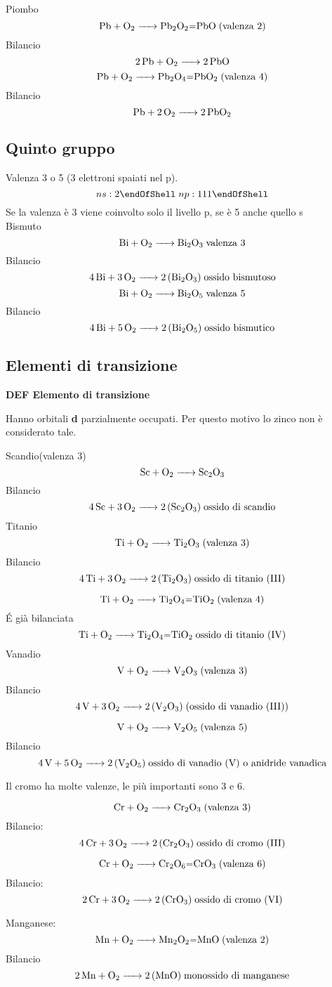 Piombo
$$\ce{Pb + O_2 -> Pb_2O_2=PbO} \; \text{(valenza 2)}$$
Bilancio
$$\ce{2Pb + O_2 -> 2PbO}$$
$$\ce{Pb + O_2 -> Pb_2O_4=PbO_2} \; \text{(valenza 4)}$$
Bilancio
$$\ce{Pb + 2O_2 -> 2PbO_2}$$
\subsection{Quinto gruppo}
Valenza 3 o 5 (3 elettroni spaiati nel p).
$$\subshell{ns:2} \; \subshell{np:111}$$
Se la valenza è 3 viene coinvolto solo il livello p, se è 5 anche quello s\\
Bismuto
$$\ce{ Bi + O_2 -> Bi_2O_3} \; \text{valenza 3}$$ Bilancio
$$\ce{ 4 Bi + 3 O_2 -> 2 (Bi_2O_3)} \; \text{ossido bismutoso}$$
$$\ce{ Bi + O_2 -> Bi_2O_5} \; \text{valenza 5}$$Bilancio
$$\ce{ 4 Bi + 5 O_2 -> 2 (Bi_2O_5)} \; \text{ossido bismutico}$$
\subsection{Elementi di transizione}
\textbf{DEF Elemento di transizione}

Hanno orbitali \textbf{d} parzialmente occupati. Per questo motivo lo zinco non è considerato tale.

Scandio(valenza 3)
$$\ce{ Sc + O_2 -> Sc_2O_3}$$ Bilancio
$$\ce{4 Sc + 3O_2 -> 2 (Sc_2O_3)} \; \text{ossido di scandio}$$
Titanio
$$\ce{ Ti + O_2 -> Ti_2O_3} \; \text{(valenza 3)}$$ Bilancio
$$\ce{4 Ti + 3 O_2 -> 2 (Ti_2O_3)} \; \text{ossido di titanio (III)}$$

$$\ce{ Ti + O_2 -> Ti_2O_4=TiO_2} \; \text{(valenza 4)}$$
É già bilanciata
$$\ce{ Ti + O_2 -> Ti_2O_4=TiO_2} \; \text{ossido di titanio (IV)}$$
Vanadio
$$\ce{ V + O_2 -> V_2O_3} \; \text{(valenza 3)}$$ Bilancio
$$\ce{ 4 V + 3 O_2 -> 2 (V_2O_3)} \; \text{(ossido di vanadio (III))}$$

$$\ce{V + O_2 -> V_2O_5} \; \text{(valenza 5)}$$Bilancio
$$\ce{ 4 V + 5 O_2 -> 2 (V_2O_5)} \;  \text{ossido di vanadio (V) o anidride vanadica}$$

Il cromo ha molte valenze, le più importanti sono 3 e 6.

$$\ce{ Cr + O_2 -> Cr_2O_3} \; \text{(valenza 3)}$$ Bilancio:
$$ \ce{ 4 Cr + 3 O_2 -> 2 (Cr_2O_3)}\; \text{ossido di cromo (III)}$$

$$\ce{ Cr + O_2 -> Cr_2O_6=CrO_3} \; \text{(valenza 6)}$$ Bilancio:
$$\ce{ 2 Cr + 3 O_2 -> 2 (CrO_3)}\; \text{ossido di cromo (VI)}$$

Manganese:
\\
$$\ce{ Mn + O_2 -> Mn_2O_2=MnO} \; \text{(valenza 2)}$$ Bilancio
$$\ce{ 2 Mn + O_2 -> 2 (MnO)} \; \text{monossido di manganese}$$

